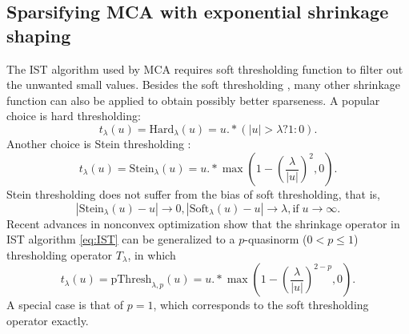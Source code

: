 \subsection{Sparsifying MCA with exponential shrinkage shaping}

The IST algorithm used by MCA requires soft thresholding function to filter out the unwanted small values. Besides the soft thresholding \citep{donoho1995noising}, many other shrinkage function can also be applied to obtain possibly better sparseness. A popular choice is hard thresholding:
\begin{equation}
t_{\lambda}(u)=\mathrm{Hard}_{\lambda}(u)=u.*(|u|>\lambda?1:0).
\end{equation}
Another choice is Stein thresholding \citep{peyre2010advanced}:
\begin{equation}\label{eq:stein}
t_{\lambda}(u)=\mathrm{Stein}_{\lambda}(u)=u.*\max\left(1-(\frac{\lambda}{|u|})^{2},0\right).
\end{equation}
Stein thresholding does not suffer from the bias of soft thresholding, that is,
\begin{equation}
|\mathrm{Stein}_{\lambda}(u)-u| \rightarrow 0, |\mathrm{Soft}_{\lambda}(u)-u|\rightarrow \lambda,
\mathrm{if}\; u\rightarrow\infty.
\end{equation}
Recent advances in nonconvex optimization \citep{chartrand2012,chartrand2013generalized,chartrand2013nonconvex} show that the shrinkage operator in IST algorithm \eqref{eq:IST} can be generalized to a $p$-quasinorm ($0<p\leq1$) thresholding operator $T_{\lambda}$, in which
\begin{equation}\label{eq:pthresh}
t_{\lambda}(u)=\mathrm{pThresh}_{\lambda,p}(u)=u.*\max\left(1-(\frac{\lambda}{|u|})^{2-p},0\right).
\end{equation}
A special case is that of $p=1$, which corresponds to the soft thresholding operator exactly.



